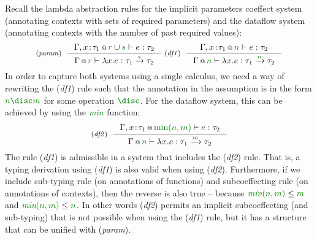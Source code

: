 Recall the lambda abstraction rules for the implicit parameters coeffect system (annotating
contexts with sets of required parameters) and the dataflow system (annotating contexts with the
number of past required values):
%
\begin{equation*}
\tyrule{param}
  {\coctx{\Gamma, x\!:\!\tau_1}{\cclrd{r} \cup \cclrd{s}} \vdash e : \tau_2}
  {\coctx{\Gamma}{\cclrd{r}} \vdash \lambda x.e : \tau_1 \xrightarrow{\cclrd{s}} \tau_2 }
\;
\tyrule{df1}
  {\coctx{\Gamma, x\!:\!\tau_1}{\cclrd{n}} \vdash e : \tau_2}
  {\coctx{\Gamma}{\cclrd{n}} \vdash \lambda x.e : \tau_1 \xrightarrow{\cclrd{n}} \tau_2 }
\end{equation*}
%
In order to capture both systems using a single calculus, we need a way of rewriting the
(\emph{df1}) rule such that the annotation in the assumption is in the form $\cclrd{n \disc m}$
for some operation $\cclrd{\disc}$. For the dataflow system, this can be achieved by using
the $\cclrd{\emph{min}}$ function:
%
\begin{equation*}
\tyrule{df2}
  {\coctx{\Gamma, x\!:\!\tau_1}{\cclrd{\textnormal{min}(n, m)}} \vdash e : \tau_2}
  {\coctx{\Gamma}{\cclrd{n}} \vdash \lambda x.e : \tau_1 \xrightarrow{\cclrd{m}} \tau_2 }
\end{equation*}
%
The rule (\emph{df1}) is admissible in a system that includes the (\emph{df2}) rule. That is,
a typing derivation using (\emph{df1}) is also valid when using (\emph{df2}). Furthermore,
if we include sub-typing rule (on annotations of functions) and subcoeffecting rule (on
annotations of contexts), then the reverse is also true -- because
$\cclrd{\textit{min}(n, m)} \leq \cclrd{m}$ and $\cclrd{\textit{min}(n, m)} \leq \cclrd{n}$.
In other words (\emph{df2}) permits an implicit subcoeffecting (and sub-typing) that is not
possible when using the (\emph{df1}) rule, but it has a structure that can be unified
with (\emph{param}).


%
%

